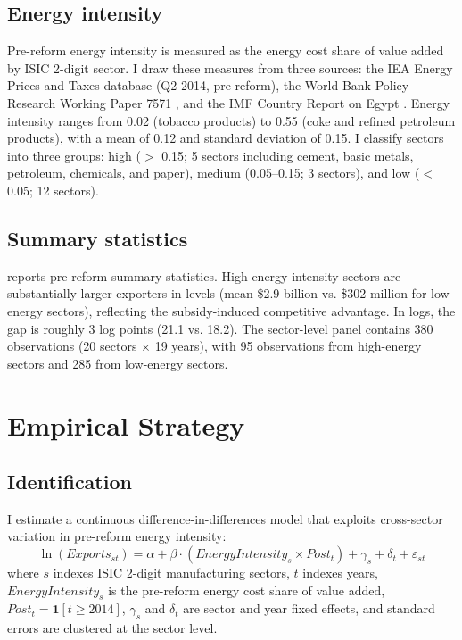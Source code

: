 \documentclass[12pt]{article}
\begin{document}
\subsection{Energy intensity}

Pre-reform energy intensity is measured as the energy cost share of value added by ISIC 2-digit sector. I draw these measures from three sources: the IEA Energy Prices and Taxes database (Q2 2014, pre-reform), the World Bank Policy Research Working Paper 7571 \citep{sdralevich2014subsidy}, and the IMF Country Report on Egypt \citep{imf2015egypt}. Energy intensity ranges from 0.02 (tobacco products) to 0.55 (coke and refined petroleum products), with a mean of 0.12 and standard deviation of 0.15. I classify sectors into three groups: high ($>$ 0.15; 5 sectors including cement, basic metals, petroleum, chemicals, and paper), medium (0.05--0.15; 3 sectors), and low ($<$ 0.05; 12 sectors).

\subsection{Summary statistics}

 reports pre-reform summary statistics. High-energy-intensity sectors are substantially larger exporters in levels (mean \$2.9 billion vs. \$302 million for low-energy sectors), reflecting the subsidy-induced competitive advantage. In logs, the gap is roughly 3 log points (21.1 vs. 18.2). The sector-level panel contains 380 observations (20 sectors $\times$ 19 years), with 95 observations from high-energy sectors and 285 from low-energy sectors.



\section{Empirical Strategy}

\subsection{Identification}

I estimate a continuous difference-in-differences model that exploits cross-sector variation in pre-reform energy intensity:
\begin{equation}
\ln(Exports_{st}) = \alpha + \beta \cdot (EnergyIntensity_s \times Post_t) + \gamma_s + \delta_t + \varepsilon_{st}
\label{eq:main}
\end{equation}
where $s$ indexes ISIC 2-digit manufacturing sectors, $t$ indexes years, $EnergyIntensity_s$ is the pre-reform energy cost share of value added, $Post_t = \mathbf{1}[t \geq 2014]$, $\gamma_s$ and $\delta_t$ are sector and year fixed effects, and standard errors are clustered at the sector level.
\end{document}
